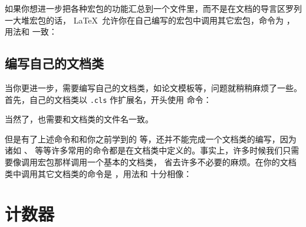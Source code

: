 如果你想进一步把各种宏包的功能汇总到一个文件里，而不是在文档的导言区罗列一大堆宏包的话，
\LaTeX\ 允许你在自己编写的宏包中调用其它宏包，命令为 ，用法和 
一致：
\begin{command}
\end{command}

\subsection{编写自己的文档类}

当你更进一步，需要编写自己的文档类，如论文模板等，问题就稍稍麻烦了一些。首先，自己的文档类以 \texttt{.cls} 作扩展名，开头使用
 命令：
\begin{command}
\end{command}
当然了，也需要和文档类的文件名一致。

但是有了上述命令和和你之前学到的  等，还并不能完成一个文档类的编写，因为诸如 、
 等等许多常用的命令都是在文档类中定义的。事实上，许多时候我们只需要像调用宏包那样调用一个基本的文档类，
省去许多不必要的麻烦。在你的文档类中调用其它文档类的命令是  ，用法和  十分相像：
\begin{command}
\end{command}

\section{计数器}\label{sec:counters}

\endinput